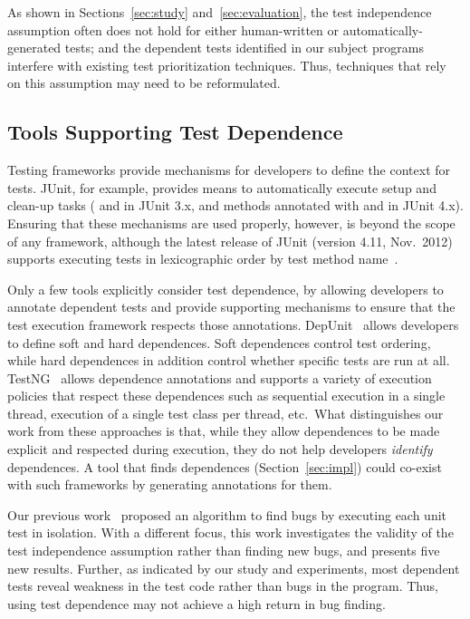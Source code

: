 
As shown in Sections~\ref{sec:study} and~\ref{sec:evaluation},
the test independence assumption often does not hold for either
human-written or automatically-generated tests; and the dependent
tests identified in our subject programs interfere with
existing test prioritization techniques. Thus, techniques
that rely on this assumption may need to be reformulated.

\subsection{Tools Supporting Test Dependence}
\label{sec:supporting}

Testing frameworks provide mechanisms
for developers to define the context for tests.
JUnit, for example, provides means to
automatically execute setup and clean-up tasks
( and  in JUnit
3.x, and methods annotated with  and  in
JUnit 4.x). Ensuring that these mechanisms are used properly, however, is
beyond the scope of any framework, although the latest release of JUnit
(version 4.11, Nov.~2012)
supports executing tests in lexicographic order by test method name~\cite{junitordering}.


Only a few tools explicitly consider test dependence, by
allowing developers to annotate dependent tests and
provide supporting mechanisms to ensure that the test execution framework
respects those annotations.  DepUnit~\cite{depunit}
allows developers to define soft and hard dependences. Soft dependences control
test ordering, while hard dependences in addition control whether specific tests are
run at all.  TestNG~\cite{testng} 
allows dependence annotations and supports a variety of execution policies
that respect these dependences
such as sequential execution
in a single thread, execution of a single test class per thread, etc.\
What distinguishes our work from these approaches is that, while they allow dependences
to be made explicit and respected during execution, they do not help developers
\emph{identify} dependences.  A tool that finds dependences
(Section~\ref{sec:impl}) could co-exist
with such frameworks by generating annotations for them.

Our previous work~\cite{DBLP:conf/sigsoft/MusluSW11} proposed
an algorithm to find bugs by executing each unit
test in isolation. With a different focus,
this work investigates the validity of the test independence assumption
rather than finding new bugs,
and presents five new results.
Further, as indicated by our study and experiments, most dependent
tests reveal weakness in the test code rather than bugs in the program. Thus,
using test dependence may not achieve a high return in bug finding.

